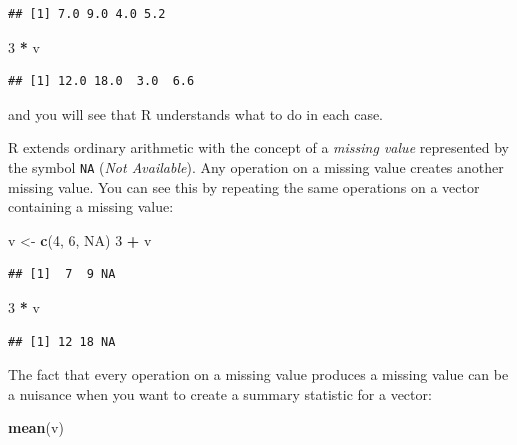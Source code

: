 \documentclass[
]{book}
\newenvironment{Shaded}{\begin{snugshade}}{\end{snugshade}}
\newcommand{\ConstantTok}[1]{\textcolor[rgb]{0.56,0.35,0.01}{#1}}
\newcommand{\DecValTok}[1]{\textcolor[rgb]{0.00,0.00,0.81}{#1}}
\newcommand{\FunctionTok}[1]{\textcolor[rgb]{0.13,0.29,0.53}{\textbf{#1}}}
\newcommand{\NormalTok}[1]{#1}
\newcommand{\OtherTok}[1]{\textcolor[rgb]{0.56,0.35,0.01}{#1}}
\newcommand{\SpecialCharTok}[1]{\textcolor[rgb]{0.81,0.36,0.00}{\textbf{#1}}}
\begin{document}
\begin{verbatim}
## [1] 7.0 9.0 4.0 5.2
\end{verbatim}

\begin{Shaded}
\begin{Highlighting}[]
\DecValTok{3} \SpecialCharTok{*}\NormalTok{ v}
\end{Highlighting}
\end{Shaded}

\begin{verbatim}
## [1] 12.0 18.0  3.0  6.6
\end{verbatim}

and you will see that R understands what to do in each case.

R extends ordinary arithmetic with the concept of a \emph{missing value}
represented by the symbol \texttt{NA} (\emph{Not Available}). Any
operation on a missing value creates another missing value. You can
see this by repeating the same operations on a vector containing a
missing value:

\begin{Shaded}
\begin{Highlighting}[]
\NormalTok{v }\OtherTok{\textless{}{-}} \FunctionTok{c}\NormalTok{(}\DecValTok{4}\NormalTok{, }\DecValTok{6}\NormalTok{, }\ConstantTok{NA}\NormalTok{)}
\DecValTok{3} \SpecialCharTok{+}\NormalTok{ v}
\end{Highlighting}
\end{Shaded}

\begin{verbatim}
## [1]  7  9 NA
\end{verbatim}

\begin{Shaded}
\begin{Highlighting}[]
\DecValTok{3} \SpecialCharTok{*}\NormalTok{ v}
\end{Highlighting}
\end{Shaded}

\begin{verbatim}
## [1] 12 18 NA
\end{verbatim}

The fact that every operation on a missing value produces a missing value
can be a nuisance when you want to create a summary statistic for a vector:

\begin{Shaded}
\begin{Highlighting}[]
\FunctionTok{mean}\NormalTok{(v)}
\end{Highlighting}
\end{Shaded}
\end{document}

